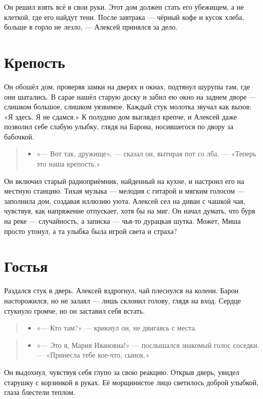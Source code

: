 \documentclass[12pt,a4paper]{book}
\newenvironment{dialogue}{\begin{quote}\itshape\begin{itemize}\item[]}{\end{itemize}\end{quote}}
\begin{document}
Он решил взять всё в свои руки. Этот дом должен стать его убежищем, а не клеткой, где его найдут тени. После завтрака — чёрный кофе и кусок хлеба, больше в горло не лезло, — Алексей принялся за дело.

\section{Крепость}

Он обошёл дом, проверяя замки на дверях и окнах, подтянул шурупы там, где они шатались. В сарае нашёл старую доску и забил ею окно на заднем дворе — слишком большое, слишком уязвимое. Каждый стук молотка звучал как вызов: «Я здесь. Я не сдамся.» К полудню дом выглядел крепче, и Алексей даже позволил себе слабую улыбку, глядя на Барона, носившегося по двору за бабочкой.

\begin{dialogue}
«— Вот так, дружище», — сказал он, вытирая пот со лба. — «Теперь это наша крепость.»
\end{dialogue}

Он включил старый радиоприёмник, найденный на кухне, и настроил его на местную станцию. Тихая музыка — мелодия с гитарой и мягким голосом — заполнила дом, создавая иллюзию уюта. Алексей сел на диван с чашкой чая, чувствуя, как напряжение отпускает, хотя бы на миг. Он начал думать, что буря на реке — случайность, а записка — чья-то дурацкая шутка. Может, Миша просто утонул, а та улыбка была игрой света и страха?

\section{Гостья}

Раздался стук в дверь. Алексей вздрогнул, чай плеснулся на колени. Барон насторожился, но не залаял — лишь склонил голову, глядя на вход. Сердце стукнуло громче, но он заставил себя встать.

\begin{dialogue}
«— Кто там?» — крикнул он, не двигаясь с места.
\end{dialogue}

\begin{dialogue}
«— Это я, Мария Ивановна!» — послышался знакомый голос соседки. — «Принесла тебе кое-что, сынок.»
\end{dialogue}

Он выдохнул, чувствуя себя глупо за свою реакцию. Открыв дверь, увидел старушку с корзинкой в руках. Её морщинистое лицо светилось доброй улыбкой, глаза блестели теплом.
\end{document}
